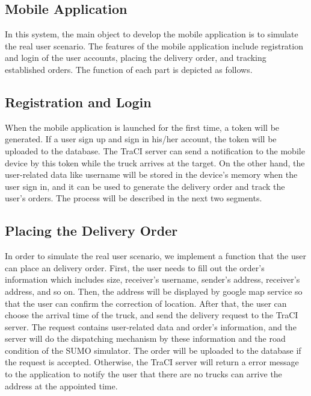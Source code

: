 \documentclass[12pt]{ksthesis}
\begin{document}
\begin{thesis}
{\section{Mobile Application}
In this system, the main object to develop the mobile application is to simulate the real user scenario. The features of the mobile application include registration and login of the user accounts, placing the delivery order, and tracking established orders. The function of each part is depicted as follows.

\subsection{Registration and Login}
When the mobile application is launched for the first time, a token will be generated. If a user sign up and sign in his/her account, the token will be uploaded to the database. The TraCI server can send a notification to the mobile device by this token while the truck arrives at the target. On the other hand, the user-related data like username will be stored in the device’s memory when the user sign in, and it can be used to generate the delivery order and track the user’s orders. The process will be described in the next two segments.

\subsection{Placing the Delivery Order}
In order to simulate the real user scenario, we implement a function that the user can place an delivery order. First, the user needs to fill out the order’s information which includes size, receiver’s username, sender’s address, receiver’s address, and so on. Then, the address will be displayed by google map service so that the user can confirm the correction of location. After that, the user can choose the arrival time of the truck, and send the delivery request to the TraCI server. The request contains user-related data and order’s information, and the server will do the dispatching mechanism by these information and the road condition of the SUMO simulator. The order will be uploaded to the database if the request is accepted. Otherwise, the TraCI server will return a error message to the application to notify the user that there are no trucks can arrive the address at the appointed time.

}
\end{thesis}
\end{document}
